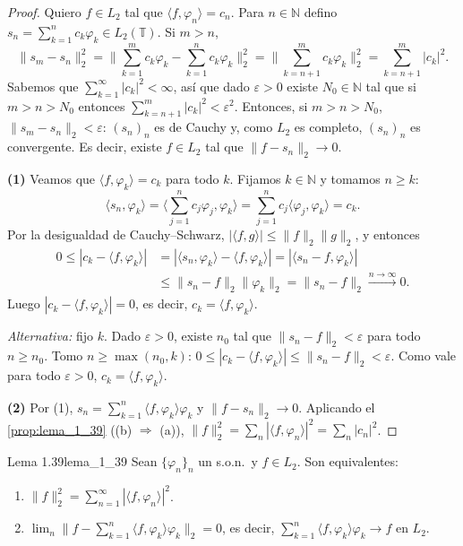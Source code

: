 \begin{proof}
Quiero $f \in L_2$ tal que $\langle f, \varphi_n\rangle = c_n$. Para $n \in \mathbb{N}$ defino $s_n = \sum_{k=1}^{n}c_k\varphi_k \in L_2(\mathbb{T})$. Si $m > n$,
\[
\|s_m - s_n\|_2^2 = \Big\|\sum_{k=1}^{m}c_k\varphi_k - \sum_{k=1}^{n}c_k\varphi_k\Big\|_2^2 = \Big\|\sum_{k=n+1}^{m}c_k\varphi_k\Big\|_2^2 = \sum_{k=n+1}^{m}|c_k|^2.
\]
Sabemos que $\sum_{k=1}^{\infty}|c_k|^2 < \infty$, así que dado $\varepsilon > 0$ existe $N_0 \in \mathbb{N}$ tal que si $m > n > N_0$ entonces $\sum_{k=n+1}^{m}|c_k|^2 < \varepsilon^2$. Entonces, si $m > n > N_0$, $\|s_m - s_n\|_2 < \varepsilon$: $(s_n)_n$ es de Cauchy y, como $L_2$ es completo, $(s_n)_n$ es convergente. Es decir, existe $f \in L_2$ tal que $\|f - s_n\|_2 \to 0$.

\textbf{(1)} Veamos que $\langle f, \varphi_k\rangle = c_k$ para todo $k$. Fijamos $k \in \mathbb{N}$ y tomamos $n \ge k$:
\[
\langle s_n, \varphi_k\rangle = \Big\langle \sum_{j=1}^{n}c_j\varphi_j, \varphi_k\Big\rangle = \sum_{j=1}^{n}c_j\langle\varphi_j, \varphi_k\rangle = c_k.
\]
Por la desigualdad de Cauchy--Schwarz, $|\langle f, g\rangle| \le \|f\|_2\|g\|_2$, y entonces
\begin{align*}
0 \le |c_k - \langle f, \varphi_k\rangle| &= |\langle s_n, \varphi_k\rangle - \langle f, \varphi_k\rangle| = |\langle s_n - f, \varphi_k\rangle| \\
&\le \|s_n - f\|_2\|\varphi_k\|_2 = \|s_n - f\|_2 \xrightarrow{n\to\infty} 0.
\end{align*}
Luego $|c_k - \langle f, \varphi_k\rangle| = 0$, es decir, $c_k = \langle f, \varphi_k\rangle$.

\emph{Alternativa:} fijo $k$. Dado $\varepsilon > 0$, existe $n_0$ tal que $\|s_n - f\|_2 < \varepsilon$ para todo $n \ge n_0$. Tomo $n \ge \max(n_0, k)$: $0 \le |c_k - \langle f, \varphi_k\rangle| \le \|s_n - f\|_2 < \varepsilon$. Como vale para todo $\varepsilon > 0$, $c_k = \langle f, \varphi_k\rangle$.

\textbf{(2)} Por (1), $s_n = \sum_{k=1}^{n}\langle f, \varphi_k\rangle\varphi_k$ y $\|f - s_n\|_2 \to 0$. Aplicando el \cref{prop:lema_1_39} ((b) $\Rightarrow$ (a)), $\|f\|_2^2 = \sum_{n}|\langle f, \varphi_n\rangle|^2 = \sum_n |c_n|^2$.
\end{proof}

\begin{proposicion}{Lema 1.39}{lema_1_39}
Sean $\{\varphi_n\}_n$ un s.o.n.\ y $f \in L_2$. Son equivalentes:
\begin{enumerate}
\item[(a)] $\|f\|_2^2 = \sum_{n=1}^{\infty}|\langle f, \varphi_n\rangle|^2$.
\item[(b)] $\lim_{n}\big\|f - \sum_{k=1}^{n}\langle f, \varphi_k\rangle\varphi_k\big\|_2 = 0$, es decir, $\sum_{k=1}^{n}\langle f, \varphi_k\rangle\varphi_k \to f$ en $L_2$.
\end{enumerate}
\end{proposicion}


